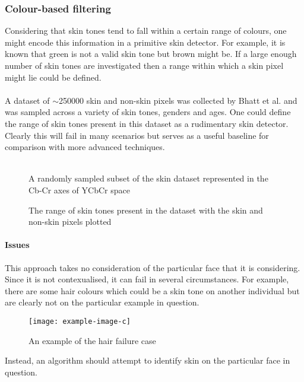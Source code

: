\subsubsection{Colour-based filtering}
\label{section:colour-filter}
Considering that skin tones tend to fall within a certain range of colours, one might encode this information in a primitive skin detector. For example, it is known that green is not a valid skin tone but brown might be. If a large enough number of skin tones are investigated then a range within which a skin pixel might lie could be defined. 
\\ \\
A dataset of $\sim$250000 skin and non-skin pixels was collected by Bhatt et al. \cite{skinDataset} and was sampled across a variety of skin tones, genders and ages. One could define the range of skin tones present in this dataset as a rudimentary skin detector. Clearly this will fail in many scenarios but serves as a useful baseline for comparison with more advanced techniques.
\\ \\

\begin{figure}[H]
    \centering
    
   \caption{A randomly sampled subset of the skin dataset represented in the Cb-Cr axes of YCbCr space} 
\end{figure}
\begin{figure}[H]
    \centering
    
   \caption{The range of skin tones present in the dataset with the skin and non-skin pixels plotted} 
\end{figure}
\paragraph{Issues}
This approach takes no consideration of the particular face that it is considering. Since it is not contexualised, it can fail in several circumstances.
For example, there are some hair colours which could be a skin tone on another individual but are clearly not on the particular example in question.
\begin{figure}[H]
    \texttt{[image: example-image-c]}
   \caption{An example of the hair failure case} 
\end{figure}
Instead, an algorithm should attempt to identify skin on the particular face in question.

